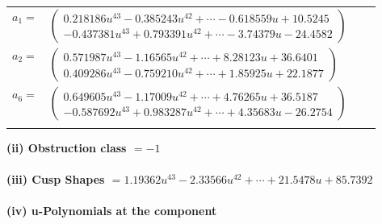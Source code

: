 \documentclass[1p]{elsarticle_modified}
\theoremstyle{definition}
\begin{document}
\begin{tabular}{m{7pt} m{180pt} m{7pt} m{180pt} }
\flushright $a_{1}=$&$\begin{pmatrix}0.218186 u^{43}-0.385243 u^{42}+\cdots-0.618559 u+10.5245\\-0.437381 u^{43}+0.793391 u^{42}+\cdots-3.74379 u-24.4582\end{pmatrix}$ \\
\flushright $a_{2}=$&$\begin{pmatrix}0.571987 u^{43}-1.16565 u^{42}+\cdots+8.28123 u+36.6401\\0.409286 u^{43}-0.759210 u^{42}+\cdots+1.85925 u+22.1877\end{pmatrix}$ \\
\flushright $a_{6}=$&$\begin{pmatrix}0.649605 u^{43}-1.17009 u^{42}+\cdots+4.76265 u+36.5187\\-0.587692 u^{43}+0.983287 u^{42}+\cdots+4.35683 u-26.2754\end{pmatrix}$\\&\end{tabular}
\flushleft \textbf{(ii) Obstruction class $= -1$}\\~\\
\flushleft \textbf{(iii) Cusp Shapes $= 1.19362 u^{43}-2.33566 u^{42}+\cdots+21.5478 u+85.7392$}\\~\\
\newpage\renewcommand{\arraystretch}{1}
\flushleft \textbf{(iv) u-Polynomials at the component}\newline \\
\end{document}
